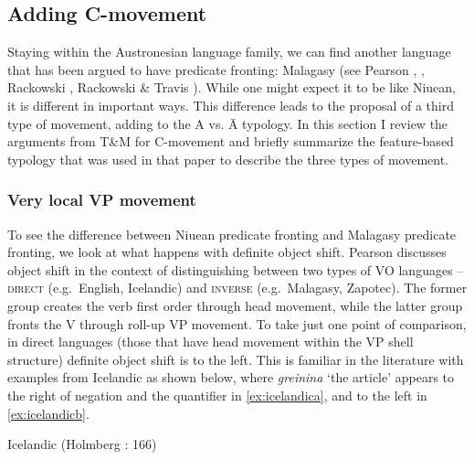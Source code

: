 \documentclass[output=paper,colorlinks,citecolor=brown,
]{langscibook}
\begin{document}
\subsection{Adding C-movement}

Staying within the Austronesian language family, we can find another language that has been argued to have predicate fronting: Malagasy (see Pearson \citeyear{Pearson:1997}, \citeyear{Pearson:2018}, Rackowski \citeyear{Rackowski:1998}, Rackowski \& Travis \citeyear{Rackowski:2000}).  While one might expect it to be  like Niuean, it is different in important ways.  This difference leads to the proposal of a third type of movement, adding to the A vs. \=A typology.  In this section I review the arguments from T\&M for C-movement and briefly summarize the feature-based typology that was used in that paper to describe the three types of movement.


\subsubsection{Very local VP movement}

To see the difference between Niuean predicate fronting and Malagasy predicate fronting, we look at what happens with definite object shift.  Pearson \citeyearpar{Pearson:2000} discusses object shift in the context of distinguishing between two types of VO languages -- \textsc{direct} (e.g.\ English, Icelandic) and \textsc{inverse} (e.g.\ Malagasy, Zapotec).  The former group creates the verb first order through head movement, while the latter group fronts the V through roll-up VP movement.  To take just one point of comparison, in direct languages (those that have head movement within the VP shell structure) definite object shift is to the left.  This is familiar in the literature with examples from Icelandic as shown below, where \textit{greinina} `the article' appears to the right of negation and the quantifier in \ref{ex:icelandica}, and to the left in \ref{ex:icelandicb}.  

\ea Icelandic (Holmberg \citeyear{Holmberg:1986}: 166)
\end{document}
